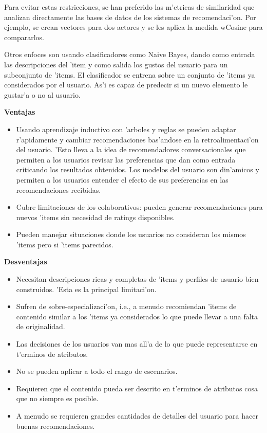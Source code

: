 \documentclass[11pt]{article}
\begin{document}
Para evitar estas restricciones, se han preferido las m'etricas de similaridad que analizan directamente las bases de datos de los sistemas de recomendaci'on. Por ejemplo, se crean vectores para dos actores y se les aplica la medida wCosine para compararlos.

Otros enfoces son usando clasificadores como Naive Bayes, dando como entrada las descripciones del 'item y como salida los gustos del usuario para un subconjunto de 'items. El clasificador se entrena sobre un conjunto de 'items ya considerados por el usuario. As'i es capaz de predecir si un nuevo elemento le gustar'a o no al usuario.

\medskip
\noindent
\textbf{Ventajas}

\begin{itemize}
\item Usando aprendizaje inductivo con 'arboles y reglas se pueden adaptar r'apidamente y cambiar recomendaciones bas'andose en la retroalimentaci'on del usuario. 'Esto lleva a la idea de recomendadores conversacionales que permiten a los usuarios revisar las preferencias que dan como entrada criticando los resultados obtenidos. Los modelos del usuario son din'amicos y permiten a los usuarios entender el efecto de sus preferencias en las recomendaciones recibidas.
\item Cubre limitaciones de los colaborativos: pueden generar recomendaciones para nuevos 'items sin necesidad de ratings disponibles.
\item Pueden manejar situaciones donde los usuarios no consideran los mismos 'items pero si 'items parecidos.
\end{itemize}

\medskip
\noindent
\textbf{Desventajas}

\begin{itemize}
\item Necesitan descripciones ricas y completas de 'items y perfiles de usuario bien construidos. 'Esta es la principal limitaci'on.
\item Sufren de sobre-especializaci'on, i.e., a menudo recomiendan 'items de contenido similar a los 'items ya considerados lo que puede llevar a una falta de originalidad.
\item Las decisiones de los usuarios van mas all'a de lo que puede representarse en t'erminos de atributos.
\item No se pueden aplicar a todo el rango de escenarios.
\item Requieren que el contenido pueda ser descrito en t'erminos de atributos cosa que no siempre es posible.
\item A menudo se requieren grandes cantidades de detalles del usuario para hacer buenas recomendaciones.
\end{itemize}
\end{document}
